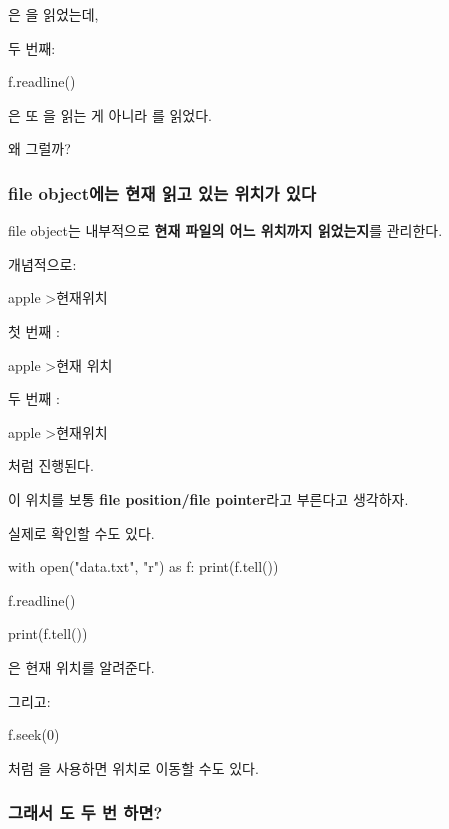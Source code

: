 은 을 읽었는데,

두 번째:

\begin{dhkcode}
f.readline()
\end{dhkcode}

은 또 을 읽는 게 아니라 를 읽었다.

왜 그럴까?

\subsubsection{file object에는 현재 읽고 있는 위치가 있다}

file object는 내부적으로 \textbf{현재 파일의 어느 위치까지 읽었는지}를 관리한다.

개념적으로:

\begin{dhkdir}
apple\nbanana\norange
>현재위치
\end{dhkdir}

첫 번째 :

\begin{dhkdir}
apple\n@banana\norange
>현재 위치
\end{dhkdir}

두 번째 :

\begin{dhkdir}
apple\nbanana\n@orange
>현재위치
\end{dhkdir}

처럼 진행된다.

이 위치를 보통 \textbf{file position/file pointer}라고 부른다고 생각하자.

실제로 확인할 수도 있다.

\begin{dhkcode}
with open("data.txt", "r") as f:
    print(f.tell())

    f.readline()

    print(f.tell())
\end{dhkcode}

은 현재 위치를 알려준다.

그리고:

\begin{dhkcode}
f.seek(0)
\end{dhkcode}

처럼 을 사용하면 위치로 이동할 수도 있다.

\subsubsection{그래서 도 두 번 하면?}

